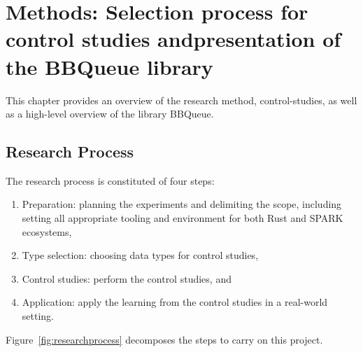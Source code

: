 \documentclass[nomenclature, english, bibtex]{kththesis}
\begin{document}
\cleardoublepage
\chapter[Methods: Control studies and BBQueue]{Methods: Selection process for control studies and\linebreak[4] presentation of the BBQueue library}
\label{ch:methods}

This chapter provides an overview of the research method, control-studies, as well as a high-level overview of the library BBQueue. 

\section{Research Process}
\label{sec:researchProcess}


The research process is constituted of four steps:

\begin{enumerate}[leftmargin=*, label=\textbf{Step \arabic*}, ref=Step \arabic*] %
    \itemsep0em
    \item \label{x:s1} Preparation: planning the experiments and delimiting the scope, including setting all appropriate tooling and environment for both Rust and SPARK ecosystems,
    \item \label{x:s2} Type selection: choosing data types for control studies,
    \item \label{x:s3} Control studies: perform the control studies, and
    \item \label{x:s4} Application: apply the learning from the control studies in a real-world setting.
\end{enumerate}
Figure~\ref{fig:researchprocess} decomposes the steps to carry on this project.
\FloatBarrier
\end{document}
